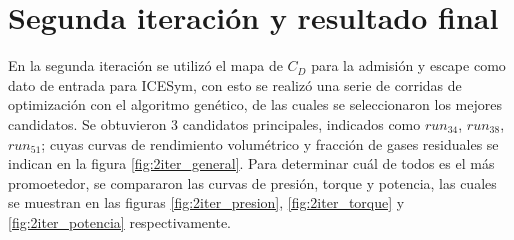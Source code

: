 \section{Segunda iteración y resultado final}
%
En la segunda iteración se utilizó el mapa de $C_D$ para la admisión y escape
como dato de entrada para ICESym, con esto se realizó una serie de corridas de
optimización con el algoritmo genético, de las cuales se seleccionaron los
mejores candidatos.
%
Se obtuvieron 3 candidatos principales, indicados como \emph{$run_34$},
\emph{$run_38$}, \emph{$run_51$}; cuyas curvas de rendimiento volumétrico y
fracción de gases residuales se indican en la figura \ref{fig:2iter_general}.
%
Para determinar cuál de todos es el más promoetedor, se compararon las curvas
de presión, torque y potencia, las cuales se muestran en las figuras
\ref{fig:2iter_presion}, \ref{fig:2iter_torque} y \ref{fig:2iter_potencia}
respectivamente.
